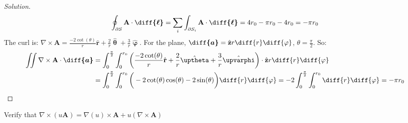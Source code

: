 \documentclass[crop=false,class=article,oneside]{standalone}
\begin{document}
\begin{proof}[Solution]
\begin{equation*}
                \oint_{\partial S}
                \mathbf{A}\cdot\boldsymbol{\diff{\ell}}
                =\sum_{i}\int_{\partial S_{i}}
                \mathbf{A}\cdot\boldsymbol{\diff{\ell}}
                =4r_{0}-\pi{r}_{0}-4r_{0}
                =-\pi r_{0}
            \end{equation*}
            The curl is:
            $\nabla\times\mathbf{A}%
             =\frac{-2\cot(\theta)}{r}\hat{\mathbf{r}}%
             +\frac{2}{r}\hat{\boldsymbol{\uptheta}}%
             +\frac{3}{r}\hat{\boldsymbol{\upvarphi}}$.
            For the plane,
            $\boldsymbol{\diff{a}}%
             =\hat{\mathbf{z}}r\diff{r}\diff{\varphi}$,
            $\theta=\frac{\pi}{2}$. So:
            \begin{align*}
                \iint\nabla\times
                \mathbf{A}\cdot\boldsymbol{\diff{a}}
                &=\int_{0}^{\frac{\pi}{2}}\int_{0}^{r_{0}}
                \bigg(
                    \frac{-2\cot(\theta)}{r}\hat{\mathbf{r}}
                    +\frac{2}{r}\hat{\boldsymbol{\uptheta}}
                    +\frac{3}{r}\hat{\boldsymbol{\upvarphi}}
                \bigg)
                \cdot\hat{\mathbf{z}}r\diff{r}\diff{\varphi}\\
                &=\int_{0}^{\frac{\pi}{2}}\int_{0}^{r_{0}}
                \bigg(
                    -2\cot(\theta)\cos(\theta)
                    -2\sin(\theta)
                \bigg)\diff{r}\diff{\varphi}
                =-2\int_{0}^{\frac{\pi}{2}}
                \int_{0}^{r_{0}}\diff{r}\diff{\varphi}
                =-\pi r_{0}
            \end{align*}
        \end{proof}
        \begin{problem}[Wangsness 1-24]
            Verify that
            $\nabla\times(u\mathbf{A})%
             =\nabla(u)\times\mathbf{A}%
             +u(\nabla\times\mathbf{A})$
        \end{problem}
\end{document}
